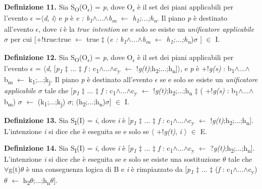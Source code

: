 \smallskip
\textbf{Definizione 11.} Sia S\textsubscript{O}(O\textsubscript{\textit{$\epsilon$}}) = \textit{p}, dove O\textsubscript{\textit{$\epsilon$}} \`e il set dei piani applicabili per l'evento \textit{$\epsilon$} =$\langle$\textit{d}, \textit{i}$\rangle$ e \textit{p} \`e \textit{e : b\textsubscript{1}$\land$...$\land$b\textsubscript{m} $\leftarrow$ h\textsubscript{1};...;h\textsubscript{n}}. Il piano \textit{p} \`e destinato all'evento \textit{$\epsilon$}, dove \textit{i} \`e la \textit{true intention} se e solo se esiste un \textit{unificatore applicabile} \textit{$\sigma$} per cui [+!true:true $\leftarrow$ true $\ddagger$ (\textit{e : b\textsubscript{1}$\land$...$\land$b\textsubscript{m} $\leftarrow$ h\textsubscript{1};...;h\textsubscript{n}})$\sigma$ ] $\in$ I.

\smallskip
\textbf{Definizione 12.} Sia S\textsubscript{O}(O\textsubscript{\textit{$\epsilon$}}) = \textit{p}, dove O\textsubscript{\textit{$\epsilon$}} \`e il set dei piani applicabili per l'evento \textit{$\epsilon$} = $\langle$\textit{d}, [\textit{p\textsubscript{1}} $\ddagger$ ... $\ddagger$ \textit{f} : c\textsubscript{1}$\land$...$\land$c\textsubscript{y} $\leftarrow$ !\textit{g(t)};h\textsubscript{2};...;h\textsubscript{n}]$\rangle$, e \textit{p} \`e +!\textit{g(s)} : b\textsubscript{1}$\land$...$\land$b\textsubscript{m} $\leftarrow$ k\textsubscript{1};...;k\textsubscript{j}. Il piano \textit{p} \`e destinato all'evento \textit{$\epsilon$} se e solo se esiste un \textit{unificatore applicabile} \textit{$\sigma$} tale che [\textit{p\textsubscript{1}} $\ddagger$ ... $\ddagger$ \textit{f} : c\textsubscript{1}$\land$...$\land$c\textsubscript{y} $\leftarrow$ !\textit{g(t)};h\textsubscript{2};...;h\textsubscript{n} $\ddagger$ (
+!\textit{g(s)} : b\textsubscript{1}$\land$...$\land$b\textsubscript{m}) $\sigma$ $\leftarrow$ (k\textsubscript{1};...;k\textsubscript{j}) $\sigma$; (h\textsubscript{2};...;h\textsubscript{n})$\sigma$] $\in$ I.

\smallskip
\textbf{Definizione 13.} Sia S\textsubscript{I}(I) = \textit{i}, dove \textit{i} \`e [\textit{p\textsubscript{1}} $\ddagger$ ... $\ddagger$ \textit{f} : c\textsubscript{1}$\land$...$\land$c\textsubscript{y} $\leftarrow$ !\textit{g(t)};h\textsubscript{2};...;h\textsubscript{n}]. L'intenzione \textit{i} si dice che \`e eseguita  se e solo se $\langle$ +!\textit{g(t)}, \textit{i} $\rangle$ $\in$ E.

\smallskip
\textbf{Definizione 14.} Sia S\textsubscript{I}(I) = \textit{i}, dove \textit{i} \`e [\textit{p\textsubscript{1}} $\ddagger$ ... $\ddagger$ \textit{f} : c\textsubscript{1}$\land$...$\land$c\textsubscript{y} $\leftarrow$ ?\textit{g(t)};h\textsubscript{2};...;h\textsubscript{n}]. L'intenzione \textit{i} si dice che \`e eseguita  se e solo se esiste una sostituzione \textit{$\theta$} tale che $\forall$g(t)\textit{$\theta$} \`e una conseguenza logica di B e \textit{i} \`e rimpiazzato da [\textit{p\textsubscript{1}} $\ddagger$ ... $\ddagger$ (\textit{f} : c\textsubscript{1}$\land$...$\land$c\textsubscript{y})\textit{$\theta$} $\leftarrow$ h\textsubscript{2}\textit{$\theta$};...;h\textsubscript{n}\textit{$\theta$}].

